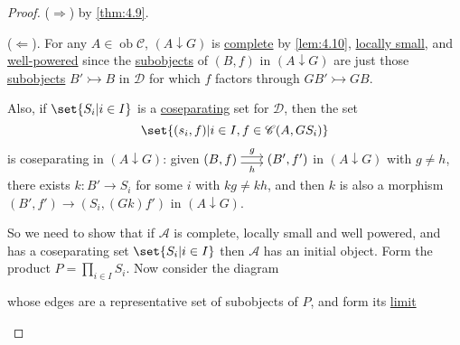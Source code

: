 \documentclass{article}
\DeclareMathOperator{\ob}{ob}
\newenvironment{tikzcdi}{\begin{tikzcd}[cramped, sep=scriptsize]}{\end{tikzcd}}
\begin{document}
\begin{proof}
  ($\Rightarrow$) by \cref{thm:4.9}.

  ($\Leftarrow$). For any $A \in \ob \mathscr{C}$, $(A \downarrow G)$ is \hyperlink{def:complete}{complete} by \cref{lem:4.10}, \hyperlink{def:lsmall}{locally small}, and \hyperlink{def:wp}{well-powered} since the \hyperlink{def:subobj}{subobjects} of $(B,f)$ in $(A \downarrow G)$ are just those \hyperlink{def:subobj}{subobjects} $B' \rightarrowtail B$ in $\mathscr{D}$ for which $f$ factors through $GB' \rightarrowtail GB$.

  Also, if $\set{S_i | i \in I}$ is a \hyperlink{def:separating}{coseparating} set for $\mathscr{D}$, then the set
  \begin{equation*}\set{(s_i, f) | i \in I, f \in \mathscr{C}(A, GS_i)}\end{equation*}
  is coseparating in $(A \downarrow G)$:
  given $\begin{tikzcdi}(B,f) \rar[shift left]{g}\rar[shift right, ']{h} & (B',f')\end{tikzcdi}$ in $(A \downarrow G)$ with $g \neq h$, there exists $k: B' \to S_i$ for some $i$ with $kg \neq kh$, and then $k$ is also a morphism $(B', f') \to (S_i, (Gk) f')$ in $(A\downarrow G)$.

  So we need to show that if $\mathscr{A}$ is complete, locally small and well powered, and has a coseparating set $\set{S_i | i \in I}$ then $\mathscr{A}$ has an initial object.
  Form the product $P = \prod_{i \in I} S_i$. Now consider the diagram
  \begin{center}
  \end{center}
  whose edges are a representative set of subobjects of $P$, and form its \hyperlink{def:limit}{limit}
  \begin{center}
  \end{center}


\end{proof}
\end{document}
